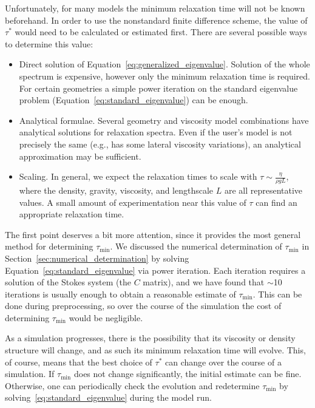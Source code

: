 \documentclass[preprint,12pt,authoryear]{elsarticle}
\begin{document}
Unfortunately, for many models the minimum relaxation time will not be known beforehand. 
In order to use the nonstandard finite difference scheme, the value of $\tau^*$ would need 
to be calculated or estimated first.  There are several possible ways to determine this value:

\begin{itemize}
\item Direct solution of Equation~\eqref{eq:generalized_eigenvalue}. Solution of the whole spectrum is expensive,
however only the minimum relaxation time is required. For certain geometries a simple power iteration on 
the standard eigenvalue problem (Equation~\eqref{eq:standard_eigenvalue}) can be enough.
\item Analytical formulae. Several geometry and viscosity model combinations have analytical solutions
for relaxation spectra. Even if the user's model is not precisely the same (e.g., has some lateral viscosity
variations), an analytical approximation may be sufficient.
\item Scaling. In general, we expect the relaxation times to scale with $\tau \sim \frac{\eta}{\rho g L}$,
where the density, gravity, viscosity, and lengthscale $L$ are all representative values.  A small amount
of experimentation near this value of $\tau$ can find an appropriate relaxation time.
\end{itemize} 

The first point deserves a bit more attention, since it provides the most general method for determining $\tau_\mathrm{min}$.
We discussed the numerical determination of $\tau_\mathrm{min}$ in Section~\ref{sec:numerical_determination}
by solving Equation~\eqref{eq:standard_eigenvalue} via power iteration.
Each iteration requires a solution of the Stokes system (the $C$ matrix), and we have found
that $\sim$10 iterations is usually enough to obtain a reasonable estimate of $\tau_\mathrm{min}$.
This can be done during preprocessing, so over the course of the simulation the cost of determining
$\tau_\mathrm{min}$ would be negligible.

As a simulation progresses, there is the possibility that its viscosity or density structure
will change, and as such its minimum relaxation time will evolve.
This, of course, means that the best choice of $\tau^*$ can change over the course of a simulation.
If $\tau_\mathrm{min}$ does not change significantly, the initial estimate can be fine.
Otherwise, one can periodically check the evolution and redetermine $\tau_\mathrm{min}$ by 
solving~\eqref{eq:standard_eigenvalue} during the model run.
\end{document}

